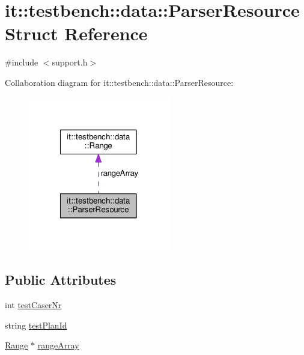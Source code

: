 \hypertarget{structit_1_1testbench_1_1data_1_1ParserResource}{\section{it\-:\-:testbench\-:\-:data\-:\-:Parser\-Resource Struct Reference}
\label{d5/ddd/structit_1_1testbench_1_1data_1_1ParserResource}
}


{\ttfamily \#include $<$support.\-h$>$}



Collaboration diagram for it\-:\-:testbench\-:\-:data\-:\-:Parser\-Resource\-:
\nopagebreak
\begin{figure}[H]
\begin{center}
\leavevmode
\includegraphics[width=178pt]{dc/d76/structit_1_1testbench_1_1data_1_1ParserResource__coll__graph}
\end{center}
\end{figure}
\subsection*{Public Attributes}
\begin{DoxyCompactItemize}
\item 
int \hyperlink{structit_1_1testbench_1_1data_1_1ParserResource_ac0c1eb32c479fb54a5eb724ae2c5f7c5}{test\-Caser\-Nr}
\item 
string \hyperlink{structit_1_1testbench_1_1data_1_1ParserResource_a3212973ffcb3bdd68d2878768b7a07d1}{test\-Plan\-Id}
\item 
\hyperlink{structit_1_1testbench_1_1data_1_1Range}{Range} $\ast$ \hyperlink{structit_1_1testbench_1_1data_1_1ParserResource_a59703b51392239c337cab02042249b49}{range\-Array}
\end{DoxyCompactItemize}


